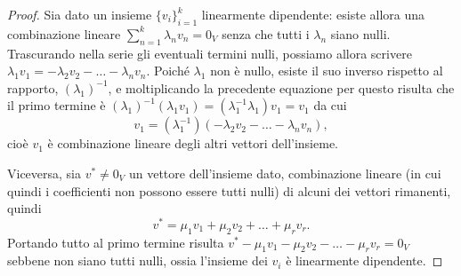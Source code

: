 \begin{proof}
	Sia dato un insieme $\{v_i\}_{i=1}^k$ linearmente dipendente: esiste allora una combinazione lineare $\sum_{n=1}^k\lambda_n v_n=0_V$ senza che tutti i $\lambda_n$ siano nulli.
	Trascurando nella serie gli eventuali termini nulli, possiamo allora scrivere $\lambda_1 v_1=-\lambda_2 v_2-\dots-\lambda_n v_n$.
	Poiché $\lambda_1$ non è nullo, esiste il suo inverso rispetto al rapporto, $(\lambda_1)^{-1}$, e moltiplicando la precedente equazione per questo risulta che il primo termine è $(\lambda_1)^{-1}(\lambda_1 v_1)=(\lambda_1^{-1}\lambda_1)v_1=v_1$ da cui
	\begin{equation*}
	  v_1=(\lambda_1^{-1})(-\lambda_2 v_2-\dots-\lambda_n v_n),
	\end{equation*}
	cioè $v_1$ è combinazione lineare degli altri vettori dell'insieme.

	Viceversa, sia $v^*\neq 0_V$ un vettore dell'insieme dato, combinazione lineare (in cui quindi i coefficienti non possono essere tutti nulli) di alcuni dei vettori rimanenti, quindi
	\begin{equation*}
		  v^*=\mu_1 v_1+\mu_2 v_2+\dots+\mu_r v_r.
	\end{equation*}
	Portando tutto al primo termine risulta $v^*-\mu_1 v_1-\mu_2 v_2-\dots-\mu_r v_r=0_V$ sebbene non siano tutti nulli, ossia l'insieme dei $v_i$ è linearmente dipendente.
\end{proof}

